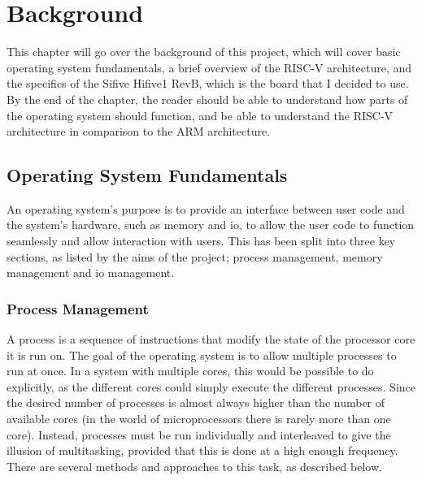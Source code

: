 \chapter[Background]{Background}
\label{cha:backgr}
This chapter will go over the background of this project, which will cover basic operating system fundamentals, a brief overview of the RISC-V architecture, and the specifics of the Sifive Hifive1 RevB, which is the board that I decided to use. By the end of the chapter, the reader should be able to understand how parts of the operating system should function, and be able to understand the RISC-V architecture in comparison to the ARM architecture.
\section{Operating System Fundamentals}
An operating system's purpose is to provide an interface between user code and the system's hardware, such as memory and \ac{io}, to allow the user code to function seamlessly and allow interaction with users. This has been split into three key sections, as listed by the aims of the project; process management, memory management and \ac{io} management\cite{modern_operating}.
\subsection{Process Management}
A process is a sequence of instructions that modify the state of the processor core it is run on. The goal of the operating system is to allow multiple processes to run at once. In a system with multiple cores, this would be possible to do explicitly, as the different cores could simply execute the different processes. Since the desired number of processes is almost always higher than the number of available cores (in the world of microprocessors there is rarely more than one core). Instead, processes must be run individually and interleaved to give the illusion of multitasking, provided that this is done at a high enough frequency. There are several methods and approaches to this task, as described below\cite{modern_operating}.
